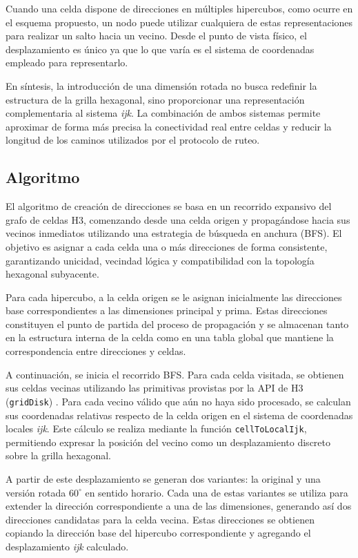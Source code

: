 Cuando una celda dispone de direcciones en múltiples hipercubos, como ocurre en el esquema propuesto, un nodo puede utilizar cualquiera de estas representaciones para realizar un salto hacia un vecino. Desde el punto de vista físico, el desplazamiento es único ya que lo que varía es el sistema de coordenadas empleado para representarlo.

En síntesis, la introducción de una dimensión rotada no busca redefinir la estructura de la grilla hexagonal, sino proporcionar una representación complementaria al sistema \textit{ijk}. La combinación de ambos sistemas permite aproximar de forma más precisa la conectividad real entre celdas y reducir la longitud de los caminos utilizados por el protocolo de ruteo.

\subsection{Algoritmo}
El algoritmo de creación de direcciones se basa en un recorrido expansivo del grafo de celdas H3, comenzando desde una celda origen y propagándose hacia sus vecinos inmediatos utilizando una estrategia de búsqueda en anchura (BFS). El objetivo es asignar a cada celda una o más direcciones de forma consistente, garantizando unicidad, vecindad lógica y compatibilidad con la topología hexagonal subyacente.

Para cada hipercubo, a la celda origen se le asignan inicialmente las direcciones base correspondientes a las dimensiones principal y prima. Estas direcciones constituyen el punto de partida del proceso de propagación y se almacenan tanto en la estructura interna de la celda como en una tabla global que mantiene la correspondencia entre direcciones y celdas.

A continuación, se inicia el recorrido BFS. Para cada celda visitada, se obtienen sus celdas vecinas utilizando las primitivas provistas por la API de H3 (\texttt{gridDisk}) \cite{h3_github}. Para cada vecino válido que aún no haya sido procesado, se calculan sus coordenadas relativas respecto de la celda origen en el sistema de coordenadas locales \textit{ijk}. Este cálculo se realiza mediante la función \texttt{cellToLocalIjk}, permitiendo expresar la posición del vecino como un desplazamiento discreto sobre la grilla hexagonal.

A partir de este desplazamiento se generan dos variantes: la original y una versión rotada $60^\circ$ en sentido horario. Cada una de estas variantes se utiliza para extender la dirección correspondiente a una de las dimensiones, generando así dos direcciones candidatas para la celda vecina. Estas direcciones se obtienen copiando la dirección base del hipercubo correspondiente y agregando el desplazamiento \textit{ijk} calculado.

